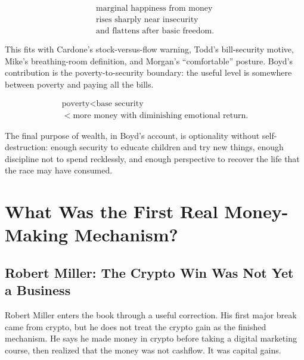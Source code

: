 \documentclass[11pt,oneside]{book}
\begin{document}
\begin{equation}
\begin{gathered}
\text{marginal happiness from money}\\
\text{rises sharply near insecurity}\\
\text{and flattens after basic freedom}.
\end{gathered}
\end{equation}

This fits with Cardone's stock-versus-flow warning, Todd's bill-security motive, Mike's breathing-room definition, and Morgan's ``comfortable'' posture. Boyd's contribution is the poverty-to-security boundary: the useful level is somewhere between poverty and paying all the bills.

\begin{equation}
\begin{gathered}
\text{poverty}<\text{base security}\\
<\text{more money with diminishing emotional return}.
\end{gathered}
\end{equation}

The final purpose of wealth, in Boyd's account, is optionality without self-destruction: enough security to educate children and try new things, enough discipline not to spend recklessly, and enough perspective to recover the life that the race may have consumed.


\chapter{What Was the First Real Money-Making Mechanism?}

\section{Robert Miller: The Crypto Win Was Not Yet a Business}

Robert Miller enters the book through a useful correction. His first major break came from crypto, but he does not treat the crypto gain as the finished mechanism. He says he made money in crypto before taking a digital marketing course, then realized that the money was not cashflow. It was capital gains.
\end{document}
